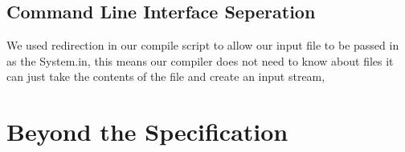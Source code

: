 \documentclass[11pt,a4paper]{article}
\begin{document}
\subsection{Command Line Interface Seperation}
\label{sub:Command Line Interface Seperation}
We used redirection in our compile script to allow our input file to be passed in as the System.in, this means our compiler does not need to know about files it can just take the contents of the file and create an input stream,

\section{Beyond the Specification}
\label{sec:Beyond the Specification}
\end{document}
